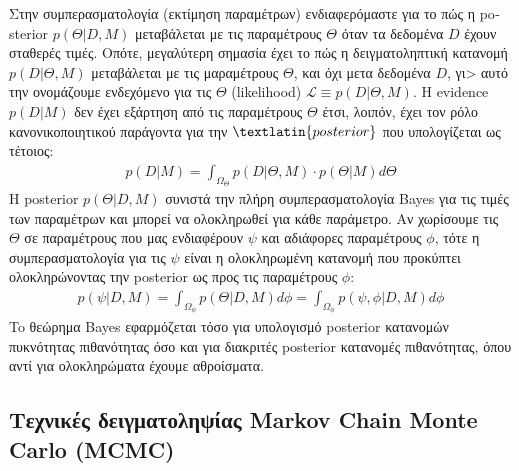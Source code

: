 Στην συμπερασματολογία (εκτίμηση παραμέτρων) ενδιαφερόμαστε για το πώς η \textlatin{posterior} $p (\Theta |D,M)$ μεταβάλεται με τις παραμέτρους $\Theta$ όταν τα δεδομένα $D$ έχουν σταθερές τιμές. Οπότε, μεγαλύτερη σημασία έχει το πώς η δειγματοληπτική κατανομή $p (D |\Theta ,M)$ μεταβάλεται με τις μαραμέτρους $\Theta$, και όχι μετα δεδομένα $D$, γι> αυτό την ονομάζουμε ενδεχόμενο για τις $\Theta$ (\textlatin{likelihood}) $\mathcal{L}\equiv p (D |\Theta ,M)$. Η \textlatin{evidence} $p (D|M)$ δεν έχει εξάρτηση από τις παραμέτρους $\Theta$ έτσι, λοιπόν, έχει τον ρόλο κανονικοποιητικού παράγοντα για την $\textlatin{posterior}$ που υπολογίζεται ως τέτοιος: \begin{equation}\begin{aligned} p (D|M) = \int_{\Omega_\Theta}  p (D |\Theta ,M)\cdot p (\Theta |M)   d\Theta \label{eq:evidence}\end{aligned}\end{equation}
Η \textlatin{posterior} $p (\Theta |D,M)$ συνιστά την πλήρη συμπερασματολογία \textlatin{Bayes} για τις τιμές των παραμέτρων και μπορεί να ολοκληρωθεί για κάθε παράμετρο. Αν χωρίσουμε τις $\Theta$ σε παραμέτρους που μας ενδιαφέρουν $\psi$ και αδιάφορες παραμέτρους $\phi$, τότε η συμπερασματολογία για τις $\psi$ είναι η ολοκληρωμένη κατανομή που προκύπτει ολοκληρώνοντας την \textlatin{posterior} ως προς τις παραμέτρους $\phi$\cite{Loredo}:
\begin{equation}\begin{aligned} p (\psi |D,M)=\int_{\Omega_\phi} p (\Theta |D,M) d\phi = \int_{\Omega_\phi} p (\psi , \phi |D,M) d\phi \label{eq:MarginalDistri}\end{aligned}\end{equation}
To θεώρημα \textlatin{Bayes} εφαρμόζεται τόσο για υπολογισμό \textlatin{posterior} κατανομών πυκνότητας πιθανότητας όσο και για διακριτές \textlatin{posterior} κατανομές πιθανότητας, όπου αντί για ολοκληρώματα έχουμε αθροίσματα.

\subsection{Τεχνικές δειγματοληψίας \textlatin{Markov Chain Monte Carlo (MCMC)}}


